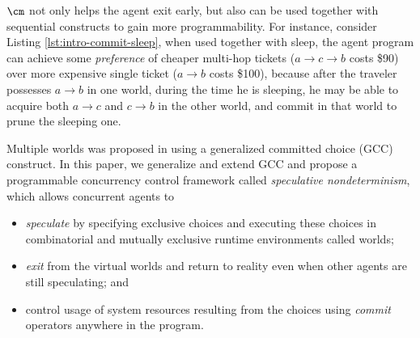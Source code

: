 $\cm$ not only helps the agent exit early, 
but also can be used together with sequential constructs 
to gain more programmability. 
For instance, consider Listing \ref{lst:intro-commit-sleep},
when used together with sleep, 
the agent program can achieve some {\em preference} of 
cheaper multi-hop tickets ($a\to c\to b$ costs \$90)
over more expensive single ticket ($a\to b$ costs \$100), 
because after the traveler possesses $a\to b$ in one world, 
during the time he is sleeping, 
he may be able to acquire both $a\to c$ and $c\to b$ 
in the other world, and commit in that world to prune the sleeping one. 

\vspace*{2mm}


Multiple worlds was proposed in \cite{JaffarYZ07} using a
generalized committed choice (GCC) construct.
%
% 
% 
In this paper, we generalize and extend GCC and
propose a programmable concurrency control framework called 
{\em speculative nondeterminism}, which allows concurrent agents to
\begin{itemize}
\item {\em speculate} by specifying exclusive choices and executing these
choices in combinatorial and mutually exclusive runtime environments called
worlds;
\item {\em exit} from the virtual worlds and return to reality even when
other agents are still speculating; and
\item control usage of system resources resulting from the choices
using {\em commit} operators anywhere in the program.
\end{itemize}
